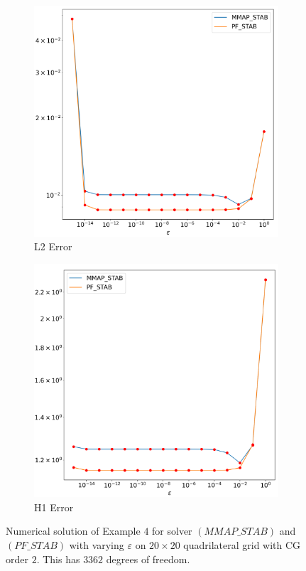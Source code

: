 \documentclass[12pt]{ociamthesis}
\begin{document}
\begin{figure}[H]
 \begin{subfigure}{0.5\textwidth}
     \includegraphics[width=\textwidth]{Pics/LHSims/E4/E4_STABL2.png}
     \caption{L2 Error}
 \end{subfigure}
   \begin{subfigure}{0.5\textwidth}
     \includegraphics[width=\textwidth]{Pics/LHSims/E4/E4_STABH1.png}
     \caption{H1 Error} \label{E4_eps_H1}
 \end{subfigure}
 \caption{Numerical solution of Example $4$ for solver $(MMAP\_STAB)$ and $(PF\_STAB)$ with varying $\varepsilon$ on $20 \times 20$ quadrilateral grid with CG order $2$. This has $3362$ degrees of freedom.} \label{E4_eps}
\end{figure}
\end{document}
